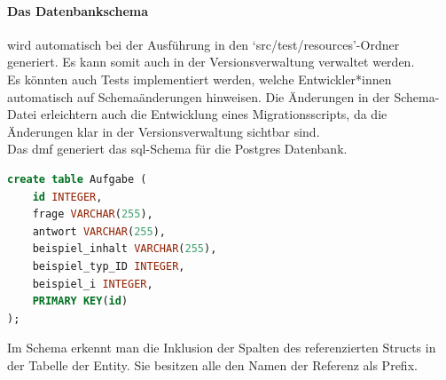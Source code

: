 \documentclass[./einleitung.tex]{subfiles}
\begin{document}
    \paragraph{Das Datenbankschema} wird automatisch bei der Ausführung in den `src/test/resources'-Ordner generiert.
    Es kann somit auch in der Versionsverwaltung verwaltet werden.\\
    Es könnten auch Tests implementiert werden, welche Entwickler*innen automatisch auf Schemaänderungen hinweisen.
    Die Änderungen in der Schema-Datei erleichtern auch die Entwicklung eines Migrationsscripts, da die Änderungen klar in der Versionsverwaltung sichtbar sind.\\
    \newpage
    Das \acrshort{dmf} generiert das \acrshort{sql}-Schema für die Postgres Datenbank.
    \begin{lstlisting}[language=sql, caption=schema.sql, label=lst:schemaSQL]
create table Aufgabe (
    id INTEGER,
    frage VARCHAR(255),
    antwort VARCHAR(255),
    beispiel_inhalt VARCHAR(255),
    beispiel_typ_ID INTEGER,
    beispiel_i INTEGER,
    PRIMARY KEY(id)
);
    \end{lstlisting}
    Im Schema erkennt man die Inklusion der Spalten des referenzierten Structs in der Tabelle der Entity.
    Sie besitzen alle den Namen der Referenz als Prefix.
\end{document}
